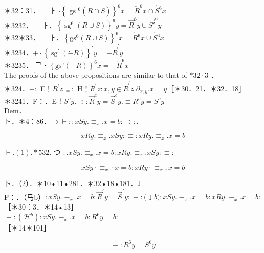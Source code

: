 \documentclass[10pt]{article}
\begin{document}
＊32：31．$\quad$ ㅏ $\cdot\left\{\text { gs }^{6}(R \dot{\cap} S)\right\}^{6} x=\overleftarrow{R}^{6} x \cap \overleftarrow{S^{6}} x$\\
＊3232．$\quad$ ㅏ．$\left\{\operatorname{sg}^{6}(R \cup S)\right\}^{6} y=\vec{R}^{6} y \cup \overrightarrow{S \prime}^{6} y$\\
＊32＊33．$\quad$ ㅏ．$\left\{\mathrm{gs}^{6}(R \cup S)\right\}^{6} x=\overleftarrow{R^{6}} x \cup \overleftarrow{S^{6}} x$\\
＊3234．$+\cdot\left\{\operatorname{sg}^{\prime}(\dot{-} R)\right\}^{\prime} y=-\vec{R}^{\prime} y$\\
＊3235． ᄀ ⋅ $\left\{\mathrm{gs}^{\mathrm{c}}(-R)\right\}^{6} x=-\overleftarrow{R}^{6} x$\\
The proofs of the above propositions are similar to that of $* 32 \cdot 3$ ．\\
＊324．$+:$ E！$R^{\prime} z_{. \equiv}:$ H！$\vec{R}^{\prime} z: x, y \in \vec{R}^{\prime} z . \partial_{x, y} . x=y$［＊30．21．＊32．18］\\
＊3241．F：．E！$S^{c} y . \supset: \vec{R}^{c} y=\vec{S}^{c} y . \equiv R^{c} y=S^{c} y$\\
Dem．\\
ト．＊4：86．$\supset \vdash:: x S y . \equiv_{x} . x=b: \supset:$.


\begin{equation*}
x R y . \equiv_{x} . x S y: \equiv: x R y . \equiv_{x} . x=b \tag{1}
\end{equation*}


$\vdash .(1) . * 532$. つ $: . x S y . \equiv_{x} . x=b: x R y . \equiv_{x} . x S y: \equiv:$


\begin{equation*}
x S y \cdot \equiv_{x} \cdot x=b: x R y \cdot \equiv_{x}, x=b \tag{2}
\end{equation*}


ト．（2）．＊10•11•281．＊32•18•181．J\\
F：．（马b）$: x S y . \equiv_{x} . x=b: \vec{R}^{\prime} y=\vec{S}^{\prime} y: \equiv:($ I $b): x S y . \equiv_{x} . x=b: x R y . \equiv_{x} . x=b:$\\
［＊30：3．＊14•13］\\
$\equiv:\left(\mathcal{H}^{b}\right): x S y . \equiv_{x} . x=b: R^{6} y=b:$\\
［＊14＊101］


\begin{equation*}
\equiv: R^{6} y=S^{6} y \tag{3}
\end{equation*}
\end{document}
